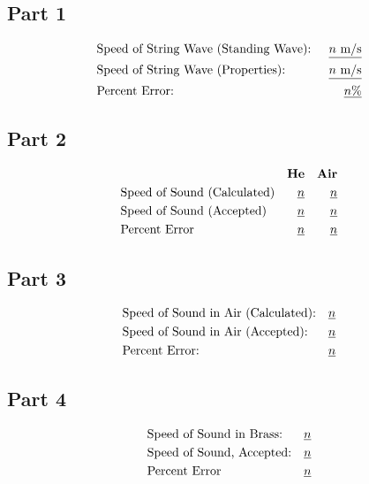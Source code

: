 \documentclass[twocolumn,english]{IEEEtran}
\theoremstyle{plain}
\theoremstyle{plain}
\begin{document}
\subsection*{Part 1}
\begin{align*}
 &\text{Speed of String Wave (Standing Wave): } &\text{\underline{$n$ m/s}} \\
 &\text{Speed of String Wave (Properties): }	&\text{\underline{$n$ m/s}} \\
 &\text{Percent Error: } 			&\text{\underline{$n$\%}}
\end{align*}

\subsection*{Part 2}
\begin{align*}
 &					&\text{\textbf{He}}	&	&\text{\textbf{Air}}	\\
 &\text{Speed of Sound (Calculated)} 	&\text{\underline{$n$}} &	&\text{\underline{$n$}} \\
 &\text{Speed of Sound (Accepted)} 	&\text{\underline{$n$}} &	&\text{\underline{$n$}} \\
 &\text{Percent Error}			&\text{\underline{$n$}}	&	&\text{\underline{$n$}}
\end{align*}

\subsection*{Part 3}
\begin{align*}
 &\text{Speed of Sound in Air (Calculated):}	&\text{\underline{$n$}} \\
 &\text{Speed of Sound in Air (Accepted):}	&\text{\underline{$n$}} \\
 &\text{Percent Error:}				&\text{\underline{$n$}}
\end{align*}

\subsection*{Part 4}
\begin{align*}
 &\text{Speed of Sound in Brass:}	&\text{\underline{$n$}} \\
 &\text{Speed of Sound, Accepted:}	&\text{\underline{$n$}} \\ %
 &\text{Percent Error}			&\text{\underline{$n$}}
\end{align*}
\end{document}
